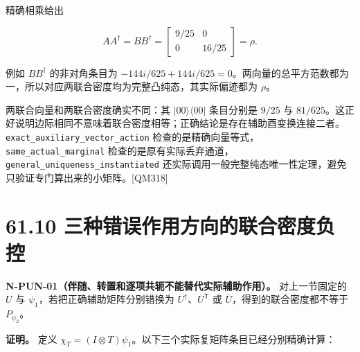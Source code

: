 \documentclass[
  11pt,
  oneside]{book}
\begin{document}
精确相乘给出

\[
AA^\dagger=BB^\dagger
=\begin{bmatrix}9/25&0\\0&16/25\end{bmatrix}=\rho.
\]

例如 \(BB^\dagger\) 的非对角条目为
\(-144i/625+144i/625=0\)。两向量的总平方范数都为一，所以对应两联合密度均为完整凸纯态，其实际偏迹都为
\(\rho\)。

两联合向量和两联合密度确实不同：其 \(|00\rangle\langle00|\) 条目分别是
\(9/25\) 与
\(81/625\)。这正好说明边际相同不意味着联合密度相等；正确结论是存在辅助酉变换连接二者。\texttt{exact\_\allowbreak auxiliary\_\allowbreak vector\_\allowbreak action}
检查的是精确向量等式，\texttt{same\_\allowbreak actual\_\allowbreak marginal}
检查的是原有实际丢弃通道，\texttt{general\_\allowbreak uniqueness\_\allowbreak instantiated}
还实际调用一般完整纯态唯一性定理，避免只验证专门算出来的小矩阵。{[}QM318{]}

\hypertarget{ux4e09ux79cdux9519ux8befux4f5cux7528ux65b9ux5411ux7684ux8054ux5408ux5bc6ux5ea6ux8d1fux63a7}{%
\section{61.10
三种错误作用方向的联合密度负控}\label{ux4e09ux79cdux9519ux8befux4f5cux7528ux65b9ux5411ux7684ux8054ux5408ux5bc6ux5ea6ux8d1fux63a7}}

\protect\hypertarget{n-pun-01}{}{}

\textbf{N-PUN-01（伴随、转置和逐项共轭不能替代实际辅助作用）。}
对上一节固定的 \(U\) 与 \(\psi_1\)，若把正确辅助矩阵分别错换为
\(U^\dagger\)、\(U^\mathsf T\) 或
\(\overline U\)，得到的联合密度都不等于 \(P_{\psi_2}\)。

\textbf{证明。} 定义
\(\chi_T=(I\otimes T)\psi_1\)。以下三个实际复矩阵条目已经分别精确计算：
\end{document}
